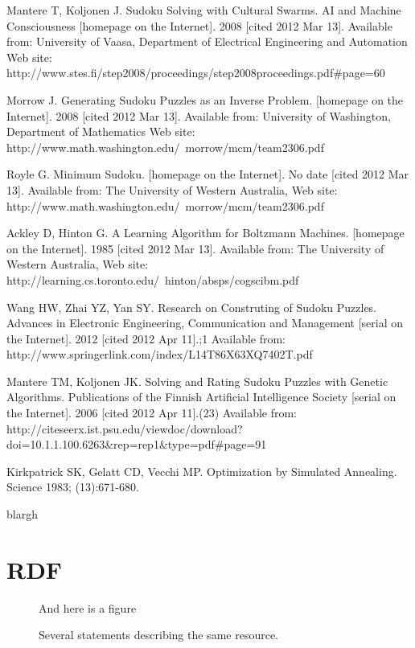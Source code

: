 \documentclass[a4paper,11pt]{kth-mag}
\begin{document}
\begin{thebibliography}{99}
Mantere T, Koljonen J. Sudoku Solving with Cultural Swarms. AI and Machine Consciousness [homepage on the Internet]. 2008 [cited 2012 Mar 13]. Available from: University of Vaasa, Department of Electrical Engineering and Automation Web site: http://www.stes.fi/step2008/proceedings/step2008proceedings.pdf\#page=60

Morrow J. Generating Sudoku Puzzles as an Inverse Problem. [homepage on the Internet]. 2008 [cited 2012 Mar 13]. Available from: University of Washington, Department of Mathematics Web site: http://www.math.washington.edu/~morrow/mcm/team2306.pdf

Royle G. Minimum Sudoku. [homepage on the Internet]. No date [cited 2012 Mar 13]. Available from: The University of Western Australia, Web site: http://www.math.washington.edu/~morrow/mcm/team2306.pdf

Ackley D, Hinton G. A Learning Algorithm for Boltzmann Machines. [homepage on the Internet]. 1985 [cited 2012 Mar 13]. Available from: The University of Western Australia, Web site: http://learning.cs.toronto.edu/~hinton/absps/cogscibm.pdf

Wang HW, Zhai YZ, Yan SY. Research on Construting of Sudoku Puzzles. Advances in Electronic Engineering, Communication and Management [serial on the Internet]. 2012 [cited 2012 Apr 11].;1 Available from: http://www.springerlink.com/index/L14T86X63XQ7402T.pdf

Mantere TM, Koljonen JK. Solving and Rating Sudoku Puzzles with Genetic Algorithms. Publications of the Finnish Artificial Intelligence Society [serial on the Internet]. 2006 [cited 2012 Apr 11].(23) Available from: http://citeseerx.ist.psu.edu/viewdoc/download?doi=10.1.1.100.6263\&rep=rep1\&type=pdf\#page=91

Kirkpatrick SK, Gelatt CD, Vecchi MP. Optimization by Simulated Annealing. Science 1983; (13):671-680.

blargh
\end{thebibliography}

\appendix
\addappheadtotoc
\chapter{RDF}\label{appA}

\begin{figure}[ht]
\begin{center}
And here is a figure
\caption{\small{Several statements describing the same resource.}}\label{RDF_4}
\end{center}
\end{figure}
\end{document}
